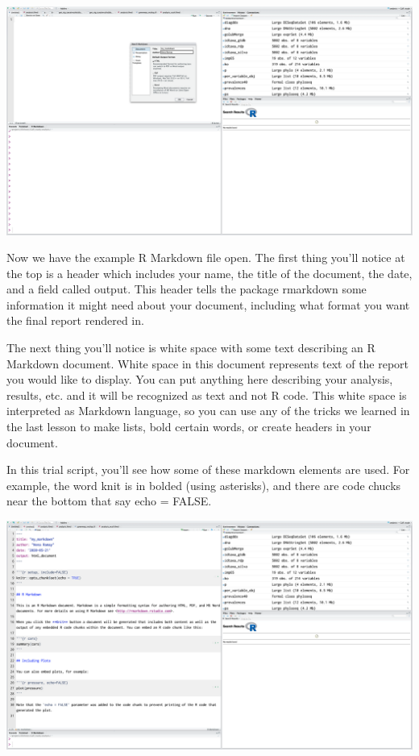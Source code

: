 \documentclass[
]{book}
\begin{document}
\includegraphics{img/mdname.png}

Now we have the example R Markdown file open. The first thing you'll notice at the top is a header which includes your name, the title of the document, the date, and a field called output. This header tells the package rmarkdown some information it might need about your document, including what format you want the final report rendered in.

The next thing you'll notice is white space with some text describing an R Markdown document. White space in this document represents text of the report you would like to display. You can put anything here describing your analysis, results, etc. and it will be recognized as text and not R code. This white space is interpreted as Markdown language, so you can use any of the tricks we learned in the last lesson to make lists, bold certain words, or create headers in your document.

In this trial script, you'll see how some of these markdown elements are used. For example, the word knit is in bolded (using asterisks), and there are code chucks near the bottom that say echo = FALSE.

\includegraphics{img/firstmd.png}
\end{document}
